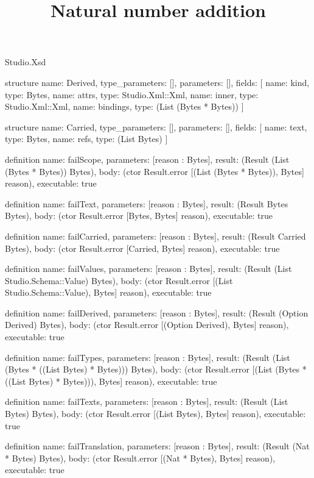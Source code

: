 \begin{lexlean}{Studio.Xsd}
\title{Natural number addition}
\begin{semanticmodule}
structure{
  name: Derived,
  type_parameters: [],
  parameters: [],
  fields: [
    {name: kind, type: Bytes},
    {name: attrs, type: Studio.Xml::Xml},
    {name: inner, type: Studio.Xml::Xml},
    {name: bindings, type: (List (Bytes * Bytes))}
  ]
}

structure{
  name: Carried,
  type_parameters: [],
  parameters: [],
  fields: [
    {name: text, type: Bytes},
    {name: refs, type: (List Bytes)}
  ]
}

definition{
  name: failScope,
  parameters: [reason : Bytes],
  result: (Result (List (Bytes * Bytes)) Bytes),
  body: (ctor Result.error [(List (Bytes * Bytes)), Bytes] reason),
  executable: true
}

definition{
  name: failText,
  parameters: [reason : Bytes],
  result: (Result Bytes Bytes),
  body: (ctor Result.error [Bytes, Bytes] reason),
  executable: true
}

definition{
  name: failCarried,
  parameters: [reason : Bytes],
  result: (Result Carried Bytes),
  body: (ctor Result.error [Carried, Bytes] reason),
  executable: true
}

definition{
  name: failValues,
  parameters: [reason : Bytes],
  result: (Result (List Studio.Schema::Value) Bytes),
  body: (ctor Result.error [(List Studio.Schema::Value), Bytes] reason),
  executable: true
}

definition{
  name: failDerived,
  parameters: [reason : Bytes],
  result: (Result (Option Derived) Bytes),
  body: (ctor Result.error [(Option Derived), Bytes] reason),
  executable: true
}

definition{
  name: failTypes,
  parameters: [reason : Bytes],
  result: (Result (List (Bytes * ((List Bytes) * Bytes))) Bytes),
  body: (ctor Result.error [(List (Bytes * ((List Bytes) * Bytes))), Bytes] reason),
  executable: true
}

definition{
  name: failTexts,
  parameters: [reason : Bytes],
  result: (Result (List Bytes) Bytes),
  body: (ctor Result.error [(List Bytes), Bytes] reason),
  executable: true
}

definition{
  name: failTranslation,
  parameters: [reason : Bytes],
  result: (Result (Nat * Bytes) Bytes),
  body: (ctor Result.error [(Nat * Bytes), Bytes] reason),
  executable: true
}


\end{semanticmodule}
\end{lexlean}
